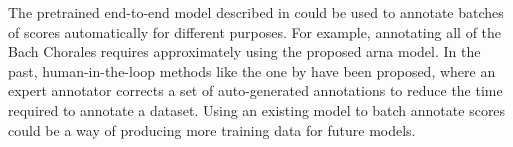 
The pretrained end-to-end model described in
 could be used to annotate
batches of scores automatically for different purposes. For
example, annotating all of the Bach
Chorales
requires approximately using the proposed \gls{arna} model.
In the past, human-in-the-loop methods like the one by
\textcite{ju2019interactive} have been proposed, where an
expert annotator corrects a set of auto-generated
annotations to reduce the time required to annotate a
dataset. Using an existing model to batch annotate scores
could be a way of producing more training data for future
models.
